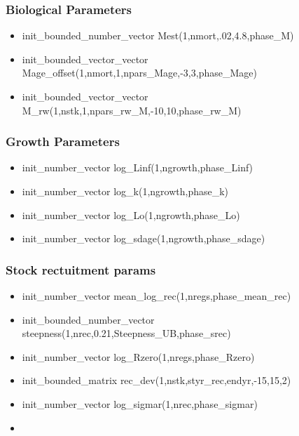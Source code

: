 \documentclass{article}
\begin{document}
\subsubsection{Biological Parameters}
\begin{itemize}
    \item init\_bounded\_number\_vector Mest(1,nmort,.02,4.8,phase\_M)
    \item init\_bounded\_vector\_vector Mage\_offset(1,nmort,1,npars\_Mage,-3,3,phase\_Mage)
    \item  init\_bounded\_vector\_vector M\_rw(1,nstk,1,npars\_rw\_M,-10,10,phase\_rw\_M)
\end{itemize}
\subsubsection{Growth Parameters}
\begin{itemize}
    \item init\_number\_vector log\_Linf(1,ngrowth,phase\_Linf)
    \item init\_number\_vector log\_k(1,ngrowth,phase\_k)
    \item init\_number\_vector log\_Lo(1,ngrowth,phase\_Lo)
    \item init\_number\_vector log\_sdage(1,ngrowth,phase\_sdage)
    
\end{itemize}
\subsubsection{Stock rectuitment params}
\begin{itemize}
    \item init\_number\_vector mean\_log\_rec(1,nregs,phase\_mean\_rec)
    \item init\_bounded\_number\_vector steepness(1,nrec,0.21,Steepness\_UB,phase\_srec)
    \item init\_number\_vector log\_Rzero(1,nregs,phase\_Rzero)
    \item init\_bounded\_matrix rec\_dev(1,nstk,styr\_rec,endyr,-15,15,2)
    \item init\_number\_vector log\_sigmar(1,nrec,phase\_sigmar)
    \item 
\end{itemize}
\end{document}
